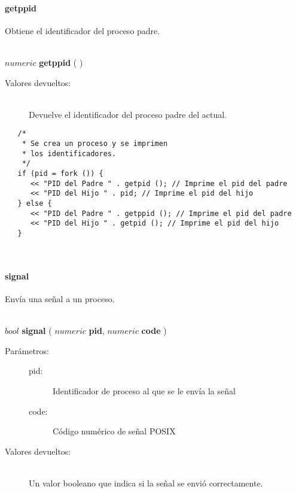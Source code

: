 \paragraph{getppid}
Obtiene el identificador del proceso padre.


\hfill \\ $numeric$ \textbf{getppid} ( )  
\begin{description}
\item[Valores devueltos:] \hfill \\
   Devuelve el identificador del proceso padre del actual.
\end{description}
     
\begin{lstlisting}  
   /*
    * Se crea un proceso y se imprimen
    * los identificadores.
    */
   if (pid = fork ()) {
      << "PID del Padre " . getpid (); // Imprime el pid del padre
      << "PID del Hijo " . pid; // Imprime el pid del hijo
   } else {
      << "PID del Padre " . getppid (); // Imprime el pid del padre
      << "PID del Hijo " . getpid (); // Imprime el pid del hijo
   }
\end{lstlisting}
\hfill\\ 

\paragraph{signal}
Envía una señal a un proceso. 

\hfill \\ $bool$ \textbf{signal} ( $numeric$ \textbf{pid}, $numeric$ \textbf{code} )  
\begin{description}
\item [Parámetros:] \hfill 
   \begin{description}
   \item[pid:] Identificador de proceso al que se le envía la señal
   \item[code:] Código numérico de señal POSIX
   \end{description}
\item[Valores devueltos:] \hfill \\
   Un valor booleano que indica si la señal se envió correctamente. 
\end{description}
     
